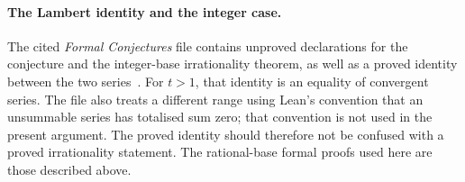 \paragraph{The Lambert identity and the integer case.}
The cited \emph{Formal Conjectures} file contains unproved declarations
for the conjecture and the integer-base irrationality theorem, as well
as a proved identity between the two series~\cite{formalconjectures1049}.
For $t>1$, that identity is an equality of convergent series. The file
also treats a different range using Lean's convention that an
unsummable series has totalised sum zero; that convention is not used
in the present argument. The proved identity should therefore not be
confused with a proved irrationality statement. The rational-base
formal proofs used here are those described above.
